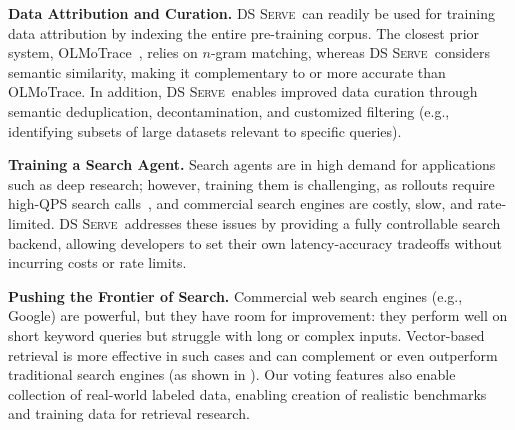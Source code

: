 \documentclass[letterpaper]{article} %
\newcommand{\sys}{\textsc{DS Serve\xspace}}%
\newcommand{\sewon}[1]{{\color{purple!70}[sewon: #1]}}
\newcommand{\yichuan}[1]{{\color{blue}[yichuan: #1]}}
\newcommand{\jinjian}[1]{{\color{teal}[jinjian: #1]}}
\newcommand{\sewon}[1]{}
\newcommand{\yichuan}[1]{}
\newcommand{\jinjian}[1]{}
\begin{document}
\vspace{.2em}
\noindent
\textbf{Data Attribution and Curation.} \sys\ can readily be used for training data attribution by indexing the entire pre-training corpus. The closest prior system, OLMoTrace~\cite{olmotrace}, relies on $n$-gram matching, whereas \sys\ considers semantic similarity, making it complementary to or more accurate than OLMoTrace. In addition, \sys\ enables improved data curation through semantic deduplication, decontamination, and customized filtering (e.g., identifying subsets of large datasets relevant to specific queries).


\vspace{.2em}
\noindent
\textbf{Training a Search Agent.}
Search agents are in high demand for applications such as deep research; however, training them is challenging, as rollouts require high-QPS search calls~\cite{jin2025search}, and commercial search engines are costly, slow, and rate-limited. \sys\ addresses these issues by providing a fully controllable search backend, allowing developers to set their own latency-accuracy tradeoffs without incurring costs or rate limits. 


\vspace{.2em}
\noindent
\textbf{Pushing the Frontier of Search.}
Commercial web search engines (e.g., Google) are powerful, but they have room for improvement: they perform well on short keyword queries but struggle with long or complex inputs. Vector-based retrieval is more effective in such cases and can complement or even outperform traditional search engines (as shown in \citet{compactds}).
Our voting features also enable collection of real-world labeled data, enabling creation of realistic benchmarks and training data for retrieval research.
\end{document}
